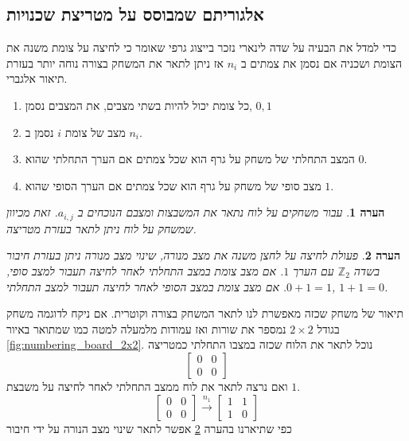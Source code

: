 \documentclass[12pt,leqno]{article}
\theoremstyle{theoremdd}
\newtheorem{comm}{הערה}[section]
\begin{document}
\subsection{אלגוריתם שמבוסס על מטריצת שכנויות}
כדי למדל את הבעיה על שדה לינארי נזכר בייצוג גרפי שאומר כי לחיצה על צומת משנה את הצומת ושכניה 
אם נסמן את צמתים ב
$n_i$
אז
ניתן לתאר את המשחק בצורה נוחה יותר בעזרת תיאור אלגברי.
\begin{enumerate}
    \item 
    כל צומת יכול להיות בשתי מצבים,
    את המצבים נסמן,
    ${0,1}$
    \item 
    מצב של צומת 
    $i$
    נסמן ב
    $n_i$.
    \item 
    המצב התחלתי של משחק על גרף הוא שכל צמתים אם הערך התחלתי
    שהוא 
    $0$.
    \item 
    מצב סופי של משחק
    על גרף הוא שכל צמתים 
    אם הערך הסופי
    שהוא
    $1$.
\end{enumerate}
\begin{comm}
    עבור משחקים על לוח נתאר את המשבצות ומצבם הנוכחים ב
    $a_{i,j}$.
    זאת מכיוון שמשחק על לוח ניתן לתאר בעזרת מטריצה.
\end{comm}
\begin{comm}
    \label{comm: sum as press operator on board}
    פעולת לחיצה על לחצן משנה 
    את מצב מנורה,
    שינוי מצב מנורה ניתן 
    בעזרת חיבור 
    בשדה 
    $\mathbb{Z}_2$
    עם הערך 
    $1$.
    אם מצב צומת במצב התחלתי לאחר לחיצה 
    תעבור למצב 
    סופי,
    $0+1=1$.
    אם מצב צומת במצב הסופי לאחר לחיצה 
    תעבור למצב 
    התחלתי,
    $1+1=0$.
\end{comm}
תיאור של משחק שכזה מאפשרת לנו
לתאר המשחק בצורה וקוטרית.
אם ניקח לדוגמה
משחק בגודל
$2 \times 2$
נמספר את 
שורות ואז עמודות מלמעלה למטה כמו שמתואר באיור
\ref{fig:numbering_board_2x2}.
נוכל לתאר את הלוח 
שכזה במצבו התחלתי כמטריצה
\[\begin{bmatrix}
0 & 0 \\
0 & 0 
\end{bmatrix}\]
ואם נרצה לתאר את לוח ממצב התחלתי לאחר לחיצה על משבצת 
$1$.
\[ 
    \begin{bmatrix}
    0 & 0 \\
    0 & 0 
    \end{bmatrix} \stackrel{n_1}{\longrightarrow}
    \begin{bmatrix}
    1 & 1 \\
    1 & 0 
    \end{bmatrix}
 \]
 כפי שתיארנו 
 בהערה 
 \ref{comm: sum as press operator on board}
 אפשר לתאר שינוי מצב הנורה על ידי חיבור 
\end{document}
